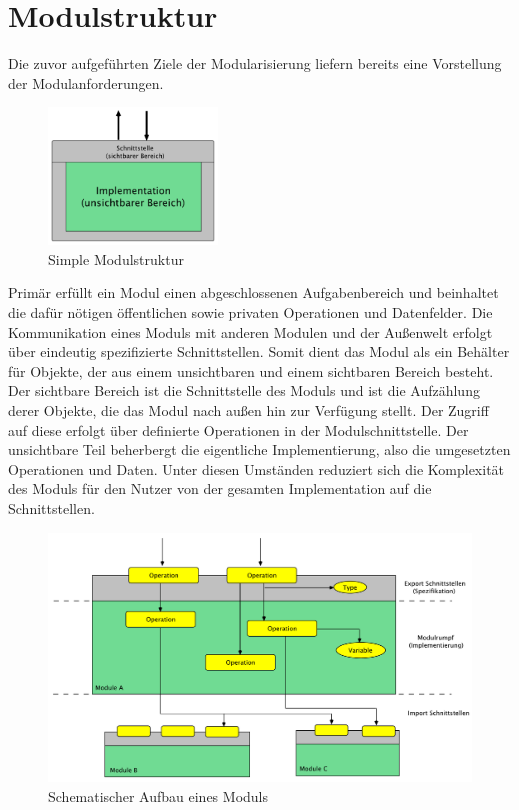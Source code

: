   \section{Modulstruktur}
      Die zuvor aufgeführten Ziele der Modularisierung liefern bereits eine Vorstellung der Modulanforderungen.
        \begin{figure}[h!] 
        \centering
        \includegraphics[width=0.4\textwidth]{material/images/simple-module.pdf}
        \caption{Simple Modulstruktur \cite{modulMitJava9}}
        \label{fig:simple-module}
      \end{figure}
    Primär erfüllt ein Modul einen abgeschlossenen Aufgabenbereich und beinhaltet die dafür nötigen öffentlichen sowie privaten Operationen und Datenfelder. Die Kommunikation eines Moduls mit anderen Modulen und der Außenwelt erfolgt über eindeutig spezifizierte Schnittstellen.\newline
    Somit dient das Modul als ein Behälter für Objekte, der aus einem unsichtbaren und einem sichtbaren Bereich besteht. Der sichtbare Bereich ist die Schnittstelle des Moduls und ist die Aufzählung derer Objekte, die das Modul nach außen hin zur Verfügung stellt. Der Zugriff auf diese erfolgt über definierte Operationen in der Modulschnittstelle. Der unsichtbare Teil beherbergt die eigentliche Implementierung, also die umgesetzten Operationen und Daten. Unter diesen Umständen reduziert sich die Komplexität des Moduls für den Nutzer von der gesamten Implementation auf die Schnittstellen. \cite{javaMod9,java9modRevealed,explorJava9,modulMitJava9}

      \begin{figure}[h!]
        \centering
        \includegraphics[width=\textwidth]{material/images/Module-workflow.pdf}
        \caption{Schematischer Aufbau eines Moduls \cite{modulMitJava9}}
        \label{fig:mw}
      \end{figure} 

